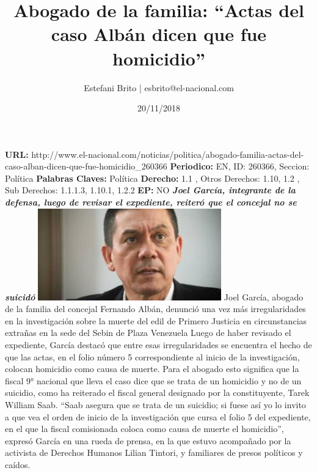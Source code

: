 \documentclass{article}%
\title{\textbf{Abogado de la familia: “Actas del caso Albán dicen que fue homicidio”}}%
\author{Estefani Brito | esbrito@el{-}nacional.com}%
\date{20/11/2018}%
\begin{document}
%
\normalsize%
\maketitle%
\textbf{URL: }%
http://www.el{-}nacional.com/noticias/politica/abogado{-}familia{-}actas{-}del{-}caso{-}alban{-}dicen{-}que{-}fue{-}homicidio\_260366\newline%
%
\textbf{Periodico: }%
EN, %
ID: %
260366, %
Seccion: %
Política\newline%
%
\textbf{Palabras Claves: }%
Política\newline%
%
\textbf{Derecho: }%
1.1%
, Otros Derechos: %
1.10, 1.2%
, Sub Derechos: %
1.1.1.3, 1.10.1, 1.2.2%
\newline%
%
\textbf{EP: }%
NO\newline%
\newline%
%
\textbf{\textit{Joel García, integrante de la defensa, luego de revisar el expediente, reiteró que el concejal no se suicidó}}%
\newline%
\newline%
%
\includegraphics[width=300px]{15.jpg}%
\newline%
%
Joel García, abogado de la familia del concejal Fernando Albán, denunció una vez más irregularidades en la investigación sobre la muerte del edil de Primero Justicia en circunstancias extrañas en la sede del Sebin de Plaza Venezuela%
\newline%
%
Luego de haber revisado el expediente, García destacó que entre esas irregularidades se encuentra el hecho de que las actas, en el folio número 5 correspondiente al inicio de la investigación, colocan homicidio como causa de muerte. Para el abogado esto significa que la fiscal 9° nacional que lleva el caso dice que se trata de un homicidio y no de un suicidio, como ha reiterado el fiscal general designado por la constituyente, Tarek William Saab.%
\newline%
%
“Saab asegura que se trata de un suicidio; si fuese así yo lo invito a que vea el orden de inicio de la investigación que cursa el folio 5 del expediente, en el que la fiscal comisionada coloca como causa de muerte el homicidio”, expresó García en una rueda de prensa, en la que estuvo acompañado por la activista de Derechos Humanos Lilian Tintori, y familiares de presos políticos y caídos.%
\end{document}
